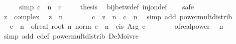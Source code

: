 \begin{isabellebody}
\ \ \isamarkupfalse%
\ \isamarkupfalse%
\ {\isacharbrackleft}{\kern0pt}simp{\isacharbrackright}{\kern0pt}{\isacharcolon}{\kern0pt}\ {\isachardoublequoteopen}c{\isacharprime}{\kern0pt}\ {\isacharcircum}{\kern0pt}\ n\ {\isacharequal}{\kern0pt}\ c{\isachardoublequoteclose}\ \isacommand{{\isachardot}{\kern0pt}}\isamarkupfalse%
\isanewline
\isanewline
\ \ \isamarkupfalse%
\ {\isacharquery}{\kern0pt}thesis\ \isamarkupfalse%
\ bij{\isacharunderscore}{\kern0pt}betw{\isacharunderscore}{\kern0pt}def\ inj{\isacharunderscore}{\kern0pt}on{\isacharunderscore}{\kern0pt}def\isanewline
\ \ \isamarkupfalse%
\ safe\isanewline
\ \ \ \ \isamarkupfalse%
\ z\ {\isacharcolon}{\kern0pt}{\isacharcolon}{\kern0pt}\ complex\ \isamarkupfalse%
\ {\isachardoublequoteopen}z\ {\isacharcircum}{\kern0pt}\ n\ {\isacharequal}{\kern0pt}\ {}{\isachardoublequoteclose}\isanewline
\ \ \ \ \isamarkupfalse%
\ {\isachardoublequoteopen}{\isacharparenleft}{\kern0pt}c{\isacharprime}{\kern0pt}\ {\isacharasterisk}{\kern0pt}\ z{\isacharparenright}{\kern0pt}\ {\isacharcircum}{\kern0pt}\ n\ {\isacharequal}{\kern0pt}\ c{\isacharprime}{\kern0pt}\ {\isacharcircum}{\kern0pt}\ n{\isachardoublequoteclose}\ \isamarkupfalse%
\ {\isacharparenleft}{\kern0pt}simp\ add{\isacharcolon}{\kern0pt}\ power{\isacharunderscore}{\kern0pt}mult{\isacharunderscore}{\kern0pt}distrib{\isacharparenright}{\kern0pt}\isanewline
\ \ \ \ \isamarkupfalse%
\ \isamarkupfalse%
\ {\isachardoublequoteopen}c{\isacharprime}{\kern0pt}\ {\isacharcircum}{\kern0pt}\ n\ {\isacharequal}{\kern0pt}\ of{\isacharunderscore}{\kern0pt}real\ {\isacharparenleft}{\kern0pt}root\ n\ {\isacharparenleft}{\kern0pt}norm\ c{\isacharparenright}{\kern0pt}\ {\isacharcircum}{\kern0pt}\ n{\isacharparenright}{\kern0pt}\ {\isacharasterisk}{\kern0pt}\ cis\ {\isacharparenleft}{\kern0pt}Arg\ c{\isacharparenright}{\kern0pt}{\isachardoublequoteclose}\isanewline
\ \ \ \ \ \ \isamarkupfalse%
\ of{\isacharunderscore}{\kern0pt}real{\isacharunderscore}{\kern0pt}power\ \isamarkupfalse%
\ n\ \isamarkupfalse%
\ {\isacharparenleft}{\kern0pt}simp\ add{\isacharcolon}{\kern0pt}\ c{\isacharprime}{\kern0pt}{\isacharunderscore}{\kern0pt}def\ power{\isacharunderscore}{\kern0pt}mult{\isacharunderscore}{\kern0pt}distrib\ DeMoivre{\isacharparenright}{\kern0pt}\isanewline
\ \ \ \ \isamarkupfalse%
\ \isamarkupfalse%

\end{isabellebody}
